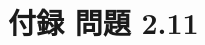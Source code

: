 \documentclass[a4j,12pt,openbib,oneside,dvipdfmx]{jreport}
\def\theequation{\arabic{chapter}.\arabic{equation}}
\def\thepage{\arabic{page}}
\begin{document}



\appendix
\section*{付録  問題 2.11}
\setcounter{equation}{3}
\def\theequation{{P2}.4.\arabic{equation}}
\setcounter{equation}{0}
\renewcommand{\thepage}{210-\arabic{page}}
\setcounter{page}{1}
\end{document}
